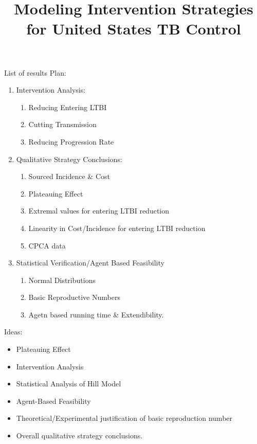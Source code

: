 \documentclass{amsart}
\title{Modeling Intervention Strategies for United States TB Control}
\begin{document}
\maketitle

{\huge \color{red} List of results}
Plan:
\begin{enumerate}
  \item Intervention Analysis: 
    \begin{enumerate}
      \item Reducing Entering LTBI
      \item Cutting Transmission
      \item Reducing Progression Rate
    \end{enumerate}
  \item Qualitative Strategy Conclusions:
    \begin{enumerate}
      \item Sourced Incidence \& Cost
      \item Plateauing Effect
      \item Extremal values for entering LTBI reduction
      \item Linearity in Cost/Incidence for entering LTBI reduction
      \item CPCA data
    \end{enumerate}
  \item Statistical Verification/Agent Based Feasibility
    \begin{enumerate}
      \item Normal Distributions
      \item Basic Reproductive Numbers
      \item Agetn based running time \& Extendibility. 
    \end{enumerate}
\end{enumerate}
Ideas:
\begin{itemize}
  \item Plateauing Effect
  \item Intervention Analysis
  \item Statistical Analysis of Hill Model
  \item Agent-Based Feasibility
  \item Theoretical/Experimental justification of basic reproduction number
  \item Overall qualitative strategy conclusions. 
\end{itemize}
\end{document}
